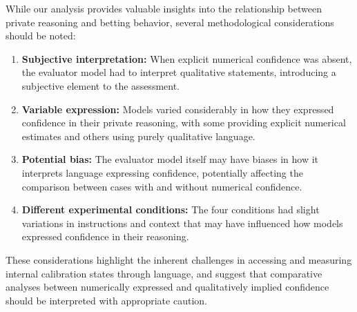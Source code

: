 \documentclass{article}
\begin{document}
While our analysis provides valuable insights into the relationship between private reasoning and betting behavior, several methodological considerations should be noted:

\begin{enumerate}
   \item \textbf{Subjective interpretation:} When explicit numerical confidence was absent, the evaluator model had to interpret qualitative statements, introducing a subjective element to the assessment.

   \item \textbf{Variable expression:} Models varied considerably in how they expressed confidence in their private reasoning, with some providing explicit numerical estimates and others using purely qualitative language.

   \item \textbf{Potential bias:} The evaluator model itself may have biases in how it interprets language expressing confidence, potentially affecting the comparison between cases with and without numerical confidence.

   \item \textbf{Different experimental conditions:} The four conditions had slight variations in instructions and context that may have influenced how models expressed confidence in their reasoning.
\end{enumerate}

These considerations highlight the inherent challenges in accessing and measuring internal calibration states through language, and suggest that comparative analyses between numerically expressed and qualitatively implied confidence should be interpreted with appropriate caution.





\end{document}
